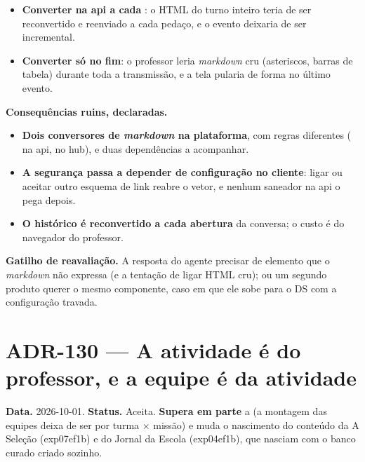 \begin{itemize}
  \item \textbf{Converter na api a cada }: o HTML do turno inteiro
    teria de ser reconvertido e reenviado a cada pedaço, e o evento deixaria de
    ser incremental.
  \item \textbf{Converter só no fim}: o professor leria \emph{markdown} cru
    (asteriscos, barras de tabela) durante toda a transmissão, e a tela pularia
    de forma no último evento.
\end{itemize}

\textbf{Consequências ruins, declaradas.}

\begin{itemize}
  \item \textbf{Dois conversores de \emph{markdown} na plataforma}, com regras
    diferentes ( na api,  no hub), e duas
    dependências a acompanhar.
  \item \textbf{A segurança passa a depender de configuração no cliente}: ligar
     ou aceitar outro esquema de link reabre o vetor, e nenhum
    saneador na api o pega depois.
  \item \textbf{O histórico é reconvertido a cada abertura} da conversa; o custo
    é do navegador do professor.
\end{itemize}

\textbf{Gatilho de reavaliação.} A resposta do agente precisar de elemento que o
\emph{markdown} não expressa (e a tentação de ligar HTML cru); ou um segundo
produto querer o mesmo componente, caso em que ele sobe para o DS com a
configuração travada.

\section{ADR-130 --- A atividade é do professor, e a equipe é da atividade}
\label{adr:atividade-e-equipe}

\textbf{Data.} 2026-10-01. \textbf{Status.} Aceita. \textbf{Supera em parte} a
 (a montagem das equipes deixa de ser por turma $\times$ missão)
e muda o nascimento do conteúdo da A Seleção (exp07ef1b) e do Jornal da Escola
(exp04ef1b), que nasciam com o banco curado criado sozinho.

